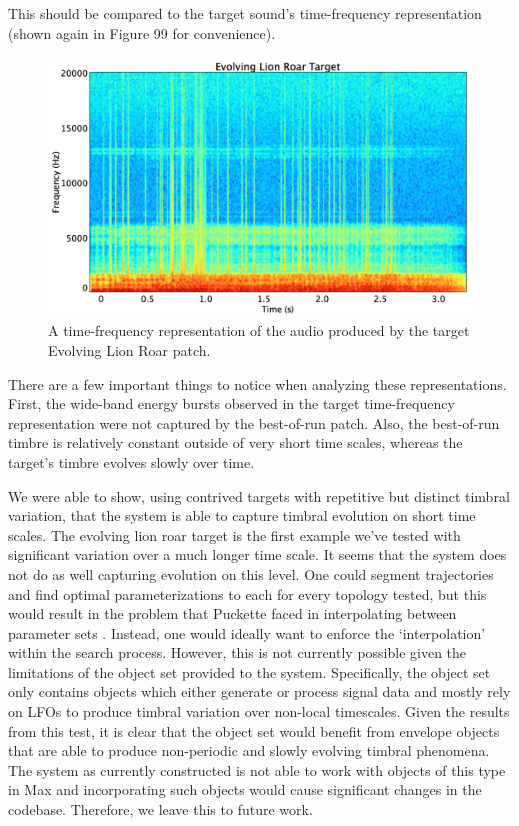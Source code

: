 \documentclass[12pt]{report} 	%
\numberwithin{figure}{chapter}
\numberwithin{table}{chapter}
\numberwithin{equation}{chapter}
\begin{document}
\begin{flushleft}
This should be compared to the target sound's time-frequency representation (shown again in Figure 99 for convenience).
\begin{figure}[h!]
\begin{center}
\includegraphics[scale=0.35]{EvolvingLionRoarTargetSTFT}
\caption[Target evolving lion roar time-frequency representation]{A time-frequency representation of the audio produced by the target Evolving Lion Roar patch.}
\end{center}
\end{figure}

There are a few important things to notice when analyzing these representations. First, the wide-band energy bursts observed in the target time-frequency representation were not captured by the best-of-run patch. Also, the best-of-run timbre is relatively \clearpage 
\noindent constant outside of very short time scales, whereas the target's timbre evolves slowly over time. 

We were able to show, using contrived targets with repetitive but distinct timbral variation, that the system is able to capture timbral evolution on short time scales. The evolving lion roar target is the first example we've tested with significant variation over a much longer time scale. It seems that the system does not do as well capturing evolution on this level. One could segment trajectories and find optimal parameterizations to each for every topology tested, but this would result in the problem that Puckette faced in interpolating between parameter sets \cite{Puckette:2004zp}. Instead, one would ideally want to enforce the `interpolation' within the search process. However, this is not currently possible given the limitations of the object set provided to the system. Specifically, the object set only contains objects which either generate or process signal data and mostly rely on LFOs to produce timbral variation over non-local timescales. Given the results from this test, it is clear that the object set would benefit from envelope objects that are able to produce non-periodic and slowly evolving timbral phenomena. The system as currently constructed is not able to work with objects of this type in Max and incorporating such objects would cause significant changes in the codebase. Therefore, we leave this to future work.


\end{flushleft}
\end{document}
